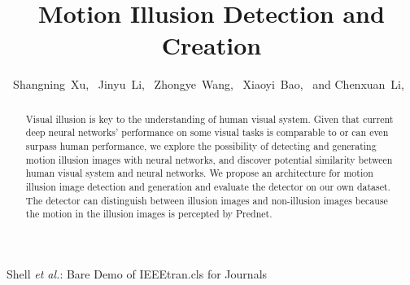 \documentclass[journal]{IEEEtran}
\begin{document}
  \title{Motion Illusion Detection and Creation}
  
  \author{
    Shangning~Xu,~
    Jinyu~Li,~
    Zhongye~Wang,~
    Xiaoyi~Bao,~
    and Chenxuan~Li,~
  }
  
  {Shell \MakeLowercase{\textit{et al.}}: Bare Demo of IEEEtran.cls for Journals}
  
  
  \maketitle
  
  \begin{abstract}
    Visual illusion is key to the understanding of human visual system. Given that current deep neural networks' performance on some visual tasks is comparable to or can even surpass human performance, we explore the possibility of detecting and generating motion illusion images with neural networks, and discover potential similarity between human visual system and neural networks. We propose an architecture for motion illusion image detection and generation and evaluate the detector on our own dataset. The detector can distinguish between illusion images and non-illusion images because the motion in the illusion images is percepted by Prednet.
  \end{abstract}
  
\end{document}
